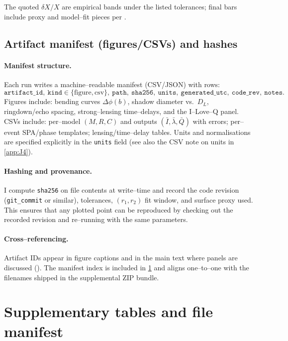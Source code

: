 \documentclass{iopjournal}
\begin{document}
The quoted $\delta X/X$ are empirical bands under the listed tolerances; final bars include proxy and model–fit pieces per .

\subsection{Artifact manifest (figures/CSVs) and hashes}\label{app:K7}
\paragraph{Manifest structure.}
Each run writes a machine–readable manifest (CSV/JSON) with rows:
\[
\texttt{artifact\_id},\ \texttt{kind}\in\{\text{figure},\text{csv}\},\ \texttt{path},\ \texttt{sha256},\
\texttt{units},\ \texttt{generated\_utc},\ \texttt{code\_rev},\ \texttt{notes}.
\]
Figures include: bending curves $\Delta\phi(b)$, shadow diameter vs.\ $D_L$, ringdown/echo spacing, strong–lensing time–delays, and the I–Love–Q panel. CSVs include: per–model $(M,R,C)$ and outputs $(\bar I,\bar\lambda,\bar Q)$ with errors; per–event SPA/phase templates; lensing/time–delay tables. Units and normalisations are specified explicitly in the \texttt{units} field (see also the CSV note on units in \cref{app:J4}).

\paragraph{Hashing and provenance.}
I compute \texttt{sha256} on file contents at write–time and record the code revision (\texttt{git\_commit} or similar), tolerances, $(r_1,r_2)$ fit window, and surface proxy used. This ensures that any plotted point can be reproduced by checking out the recorded revision and re–running with the same parameters.

\paragraph{Cross–referencing.}
Artifact IDs appear in figure captions and in the main text where panels are discussed (). The manifest index is included in \cref{app:L} and aligns one–to–one with the filenames shipped in the supplemental ZIP bundle.

\section{Supplementary tables and file manifest}\label{app:L}
\end{document}
